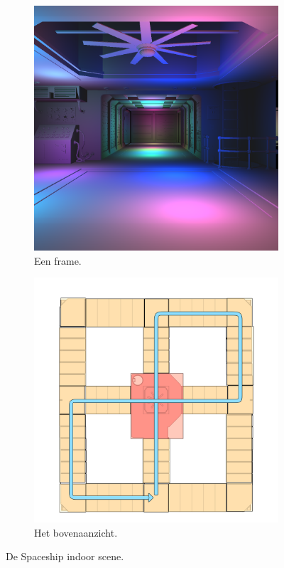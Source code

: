 \begin{figure}[tb]
  \begin{subfigure}[b]{.48\textwidth}
    \centering\includegraphics[width=\textwidth]{./img/raw/test-suite-spaceship-indoor-frame.png}
    \caption{Een frame.}
    \label{fig:test-suite-spaceship-frame}
  \end{subfigure}%
  \begin{subfigure}[b]{.51\textwidth}
    \centering\includegraphics[width=\textwidth]{./img/raw/test-suite-spaceship-indoor-map.png}
    \caption{Het bovenaanzicht.}
    \label{fig:test-suite-spaceship-map}%
  \end{subfigure}
  \caption{De Spaceship indoor scene.}
  \label{fig:test-suite-spaceship}
\end{figure}

